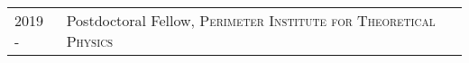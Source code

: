 \vspace*{-1.6cm}
\begin{longtable}{R{2.5cm}|p{14.8cm}}
 	\textsc{2019 - } & Postdoctoral Fellow, \textsc{Perimeter Institute for Theoretical Physics} \\
\end{longtable}
